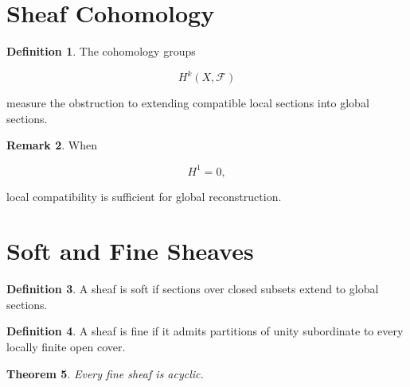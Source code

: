 \documentclass[11pt]{book}
\numberwithin{equation}{chapter}
\theoremstyle{definition}
\newtheorem{definition}{Definition}[chapter]
\newtheorem{remark}[definition]{Remark}
\theoremstyle{plain}
\newtheorem{theorem}[definition]{Theorem}
\begin{document}

\section{Sheaf Cohomology}

\begin{definition}

The cohomology groups

\[
H^k(X,\mathcal F)
\]

measure the obstruction to extending compatible local sections into
global sections.

\end{definition}


\begin{remark}

When

\[
H^1
=
0,
\]

local compatibility is sufficient for global reconstruction.

\end{remark}


\section{Soft and Fine Sheaves}

\begin{definition}

A sheaf is soft if sections over closed subsets extend to global
sections.

\end{definition}


\begin{definition}

A sheaf is fine if it admits partitions of unity subordinate to every
locally finite open cover.

\end{definition}


\begin{theorem}

Every fine sheaf is acyclic.

\end{theorem}
\end{document}
